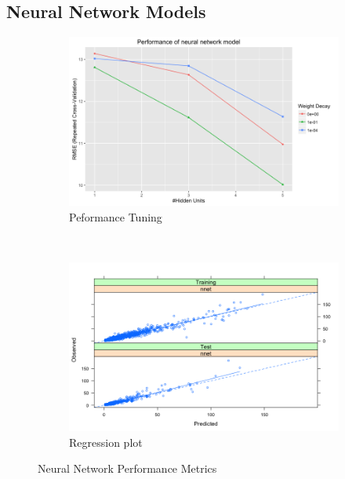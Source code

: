 \documentclass[letterpaper,12pt,titlepage,oneside,final]{report}
\begin{document}
        \subsection {Neural Network Models}
            \begin{figure}[!ht]
            \begin{subfigure}[t]{0.5\textwidth}
                \centering
                \includegraphics[width=1.1\textwidth]{nnetresults}
                \caption{Peformance Tuning}
                \label{nnetresults}
            \end{subfigure}%
                ~ 
            \begin{subfigure}[t]{0.5\textwidth}
                \centering
                \includegraphics[width=1.1\textwidth]{nnet_pred_obs}
                \caption{Regression plot}
                \label{nnet_pred_obs}
            \end{subfigure}
            \caption{Neural Network Performance Metrics}
            \end{figure}
\end{document}
